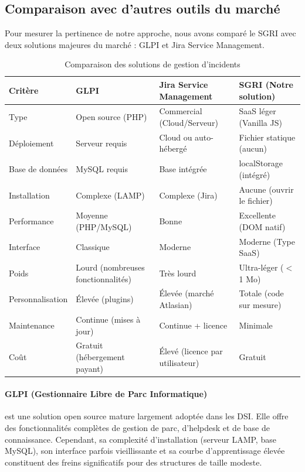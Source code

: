 \documentclass[12pt,a4paper,twoside]{report}
\begin{document}
\subsection{Comparaison avec d'autres outils du marché}

Pour mesurer la pertinence de notre approche, nous avons comparé le SGRI avec deux solutions majeures du marché : GLPI et Jira Service Management.

\begin{table}[H]
    \centering
    \caption{Comparaison des solutions de gestion d'incidents}
    \label{tab:comparison}
    \begin{tabular}{p{3cm} p{3.5cm} p{3.5cm} p{3.5cm}}
        \toprule
        \textbf{Critère} & \textbf{GLPI} & \textbf{Jira Service Management} & \textbf{SGRI (Notre solution)} \\
        \midrule
        Type & Open source (PHP) & Commercial (Cloud/Serveur) & SaaS léger (Vanilla JS) \\
        Déploiement & Serveur requis & Cloud ou auto-hébergé & Fichier statique (aucun) \\
        Base de données & MySQL requis & Base intégrée & localStorage (intégré) \\
        Installation & Complexe (LAMP) & Complexe (Jira) & Aucune (ouvrir le fichier) \\
        Performance & Moyenne (PHP/MySQL) & Bonne & Excellente (DOM natif) \\
        Interface & Classique & Moderne & Moderne (Type SaaS) \\
        Poids & Lourd (nombreuses fonctionnalités) & Très lourd & Ultra-léger ($<$ 1 Mo) \\
        Personnalisation & Élevée (plugins) & Élevée (marché Atlasian) & Totale (code sur mesure) \\
        Maintenance & Continue (mises à jour) & Continue + licence & Minimale \\
        Coût & Gratuit (hébergement payant) & Élevé (licence par utilisateur) & Gratuit \\
        \bottomrule
    \end{tabular}
\end{table}

\paragraph{GLPI (Gestionnaire Libre de Parc Informatique)} est une solution open source mature largement adoptée dans les DSI. Elle offre des fonctionnalités complètes de gestion de parc, d'helpdesk et de base de connaissance. Cependant, sa complexité d'installation (serveur LAMP, base MySQL), son interface parfois vieillissante et sa courbe d'apprentissage élevée constituent des freins significatifs pour des structures de taille modeste.
\end{document}
